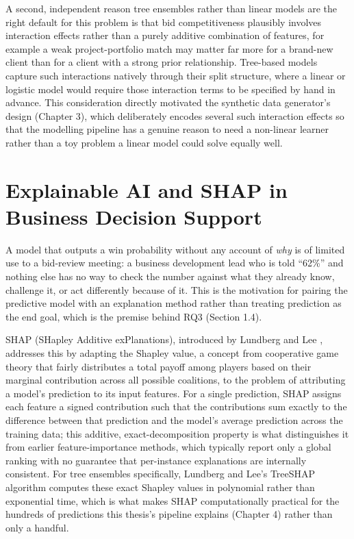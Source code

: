 A second, independent reason tree ensembles rather than linear models
are the right default for this problem is that bid competitiveness
plausibly involves interaction effects rather than a purely additive
combination of features, for example a weak project-portfolio match may
matter far more for a brand-new client than for a client with a strong
prior relationship. Tree-based models capture such interactions natively
through their split structure, where a linear or logistic model would
require those interaction terms to be specified by hand in advance. This
consideration directly motivated the synthetic data generator's design
(Chapter 3), which deliberately encodes several such interaction effects
so that the modelling pipeline has a genuine reason to need a non-linear
learner rather than a toy problem a linear model could solve equally
well.

\hypertarget{explainable-ai-and-shap-in-business-decision-support}{%
\section{Explainable AI and SHAP in Business Decision
Support}\label{explainable-ai-and-shap-in-business-decision-support}}

A model that outputs a win probability without any account of \emph{why}
is of limited use to a bid-review meeting: a business development lead
who is told ``62\%'' and nothing else has no way to check the number
against what they already know, challenge it, or act differently because
of it. This is the motivation for pairing the predictive model with an
explanation method rather than treating prediction as the end goal,
which is the premise behind RQ3 (Section 1.4).

SHAP (SHapley Additive exPlanations), introduced by Lundberg and Lee
\citep{lundberg2017unified}, addresses this by adapting the Shapley
value, a concept from cooperative game theory that fairly distributes a
total payoff among players based on their marginal contribution across
all possible coalitions, to the problem of attributing a model's
prediction to its input features. For a single prediction, SHAP assigns
each feature a signed contribution such that the contributions sum
exactly to the difference between that prediction and the model's
average prediction across the training data; this additive,
exact-decomposition property is what distinguishes it from earlier
feature-importance methods, which typically report only a global ranking
with no guarantee that per-instance explanations are internally
consistent. For tree ensembles specifically, Lundberg and Lee's TreeSHAP
algorithm computes these exact Shapley values in polynomial rather than
exponential time, which is what makes SHAP computationally practical for
the hundreds of predictions this thesis's pipeline explains (Chapter 4)
rather than only a handful.

